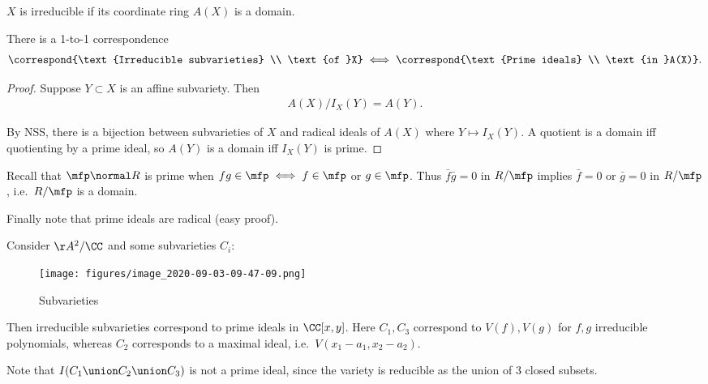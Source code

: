 \begin{proposition}[?]

\(X\) is irreducible if its coordinate ring \(A(X)\) is a domain.

\end{proposition}

\begin{proposition}[?]

There is a 1-to-1 correspondence
\begin{align*}  
\correspond{\text{Irreducible subvarieties} \\ \text{of }X}
\iff
\correspond{\text{Prime ideals} \\ \text{in }A(X)}
.\end{align*}

\end{proposition}

\begin{proof}

Suppose \(Y\subset X\) is an affine subvariety. Then
\begin{align*}  
A(X) / I_X(Y) = A(Y)
.\end{align*}

By NSS, there is a bijection between subvarieties of \(X\) and radical
ideals of \(A(X)\) where \(Y\mapsto I_X(Y)\). A quotient is a domain iff
quotienting by a prime ideal, so \(A(Y)\) is a domain iff \(I_X(Y)\) is
prime.

\end{proof}

Recall that \(\mfp \normal R\) is prime when
\(fg\in \mfp \iff f\in \mfp\) or \(g\in \mfp\). Thus
\(\bar f \bar g = 0\) in \(R/\mfp\) implies \(\bar f = 0\) or
\(\bar g = 0\) in \(R/\mfp\), i.e.~\(R/\mfp\) is a domain.

Finally note that prime ideals are radical (easy proof).

\begin{example}

Consider \(\AA^2/\CC\) and some subvarieties \(C_i\):

\begin{figure}
\centering
\texttt{[image: figures/image\_2020-09-03-09-47-09.png]}
\caption{Subvarieties}
\end{figure}

Then irreducible subvarieties correspond to prime ideals in
\(\CC[x, y]\). Here \(C_1, C_3\) correspond to \(V(f), V(g)\) for
\(f,g\) irreducible polynomials, whereas \(C_2\) corresponds to a
maximal ideal, i.e.~\(V(x_1 - a_1, x_2 - a_2)\).

Note that \(I(C_1 \union C_2 \union C_3)\) is not a prime ideal, since
the variety is reducible as the union of 3 closed subsets.

\end{example}

